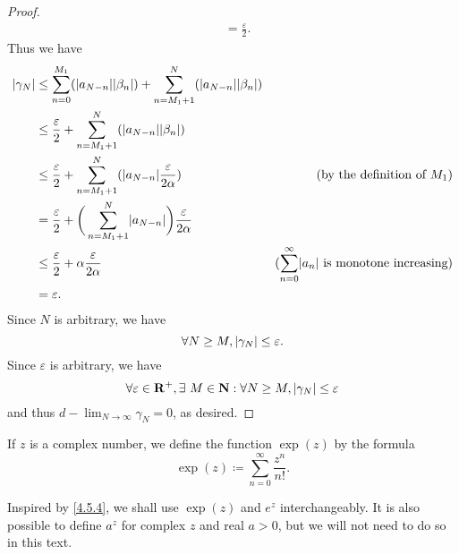 \begin{proof}
\begin{align*}
                                                       & = \frac{\varepsilon}{2}.
  \end{align*}
  Thus we have
  \begin{align*}
    \abs{\gamma_N} & \leq \sum_{n = 0}^{M_1} (\abs{a_{N - n}} \abs{\beta_n}) + \sum_{n = M_1 + 1}^N (\abs{a_{N - n}} \abs{\beta_n})                                                                     \\
                   & \leq \frac{\varepsilon}{2} + \sum_{n = M_1 + 1}^N (\abs{a_{N - n}} \abs{\beta_n})                                                                                                  \\
                   & \leq \frac{\varepsilon}{2} + \sum_{n = M_1 + 1}^N (\abs{a_{N - n}} \frac{\varepsilon}{2 \alpha})               & \text{(by the definition of \(M_1\))}                             \\
                   & = \frac{\varepsilon}{2} + \bigg(\sum_{n = M_1 + 1}^N \abs{a_{N - n}}\bigg) \frac{\varepsilon}{2 \alpha}                                                                            \\
                   & \leq \frac{\varepsilon}{2} + \alpha \frac{\varepsilon}{2 \alpha}                                               & \text{(\(\sum_{n = 0}^\infty \abs{a_n}\) is monotone increasing)} \\
                   & = \varepsilon.
  \end{align*}
  Since \(N\) is arbitrary, we have
  \[
    \forall N \geq M, \left\lvert\gamma_N\right\rvert \leq \varepsilon.
  \]
  Since \(\varepsilon\) is arbitrary, we have
  \[
    \forall \varepsilon \in \mathbf{R}^+, \exists\ M \in \mathbf{N} : \forall N \geq M, \left\lvert\gamma_N\right\rvert \leq \varepsilon
  \]
  and thus \(d - \lim_{N \to \infty} \gamma_N = 0\), as desired.
\end{proof}

\begin{definition}\label{4.6.15}
  If \(z\) is a complex number, we define the function \(\exp(z)\) by the formula
  \[
    \exp(z) \coloneqq \sum_{n = 0}^\infty \frac{z^n}{n!}.
  \]
\end{definition}

\begin{note}
  Inspired by \cref{4.5.4}, we shall use \(\exp(z)\) and \(e^z\) interchangeably.
  It is also possible to define \(a^z\) for complex \(z\) and real \(a > 0\), but we will not need to do so in this text.
\end{note}

